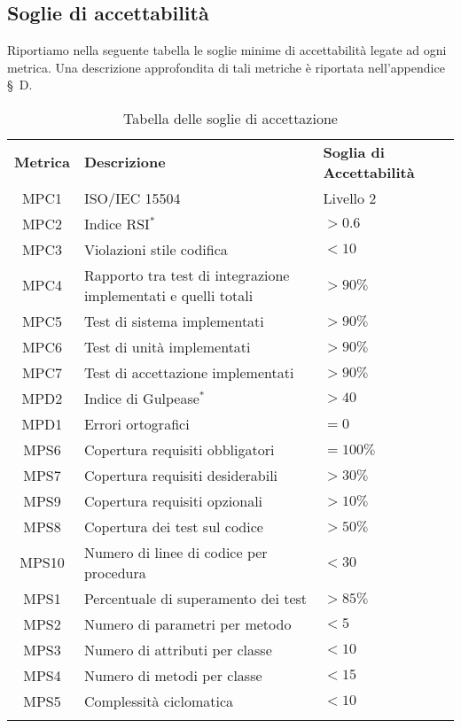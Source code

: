 \newpage

\subsection{Soglie di accettabilità}
Riportiamo nella seguente tabella le soglie minime di accettabilità legate ad ogni metrica. Una descrizione approfondita di tali metriche è riportata nell'appendice \S\ D.

\begin{longtable}{| c | p{8cm} | p{2.5cm} |}
	\rowcolor{LightBlue}
	\color{white}\bfseries Metrica & \color{white}\bfseries Descrizione &\color{white}\bfseries Soglia di \newline Accettabilità \\
	MPC1 & ISO/IEC 15504 & Livello 2 \\ \hline
	MPC2 & Indice RSI$^*$ & $> 0.6$ \\ \hline
	MPC3 & Violazioni stile codifica & $< 10$ \\ \hline
	MPC4 & Rapporto tra test di integrazione implementati e quelli totali & $> 90\%$\\ \hline
	MPC5 & Test di sistema implementati & $> 90\%$\\ \hline
	MPC6 & Test di unità implementati & $> 90\%$\\ \hline
	MPC7 & Test di accettazione implementati & $> 90\%$\\ \hline
	MPD2 & Indice di Gulpease$^*$ & $> 40$\\ \hline
	MPD1 & Errori ortografici & $= 0$\\ \hline
	MPS6 & Copertura requisiti obbligatori & $= 100\%$\\ \hline
	MPS7 & Copertura requisiti desiderabili & $> 30\%$\\ \hline
	MPS9 & Copertura requisiti opzionali & $> 10\%$\\ \hline
	MPS8 & Copertura dei test sul codice & $> 50\%$\\ \hline
	MPS10 & Numero di linee di codice per procedura & $< 30$ \\ \hline
	MPS1 & Percentuale di superamento dei test & $> 85\%$\\ \hline
	MPS2 & Numero di parametri per metodo & $< 5$\\ \hline
	MPS3 & Numero di attributi per classe & $< 10$\\ \hline
	MPS4 & Numero di metodi per classe & $< 15$\\ \hline
	MPS5 & Complessità ciclomatica & $< 10$ \\ \hline
	\caption{Tabella delle soglie di accettazione}
\end{longtable}


